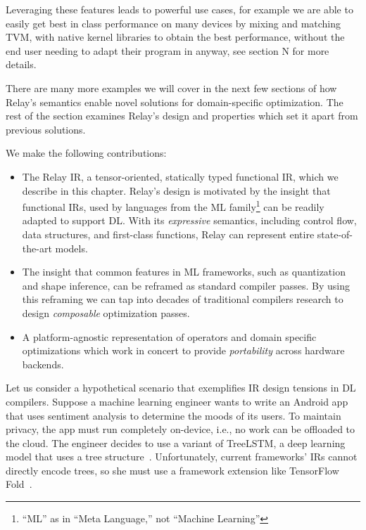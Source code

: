 Leveraging these features leads to powerful use cases, for example we are able to easily get best in class performance on many devices
by mixing and matching TVM, with native kernel libraries to obtain the best performance, without the end user needing to adapt their program
in anyway, see section N for more details.

There are many more examples we will cover in the next few sections of how Relay’s semantics enable novel solutions for domain-specific optimization.
The rest of the section examines Relay’s design and properties which set it apart from previous solutions.

We make the following contributions:
\begin{itemize}
  \item The Relay IR, a tensor-oriented, statically typed
    functional IR,
    which we describe in this chapter.
  Relay's design is motivated by the insight that functional IRs, used by
  languages from the ML family\footnote{``ML'' as in ``Meta Language,'' not
  ``Machine Learning''} can be readily adapted to support DL.
  With its \textit{expressive} semantics,
    including control flow, data structures, and first-class functions,
    Relay can represent entire state-of-the-art models.
  \item The insight that common features in ML frameworks,
    such as quantization and shape inference,
    can be reframed as standard compiler passes.
  By using this reframing we can tap into
    decades of traditional compilers research to design
    \textit{composable} optimization passes.
  \item
    A platform-agnostic representation of operators and domain specific
      optimizations which work in concert to provide \textit{portability}
      across hardware backends.
\end{itemize}


  Let us consider a hypothetical scenario that exemplifies
    IR design tensions in DL compilers.
  Suppose a machine learning engineer wants to write
    an Android app that uses sentiment analysis to
    determine the moods of its users.
  To maintain privacy, the app must run completely on-device,
    i.e., no work can be offloaded to the cloud.
  The engineer decides to use a variant of TreeLSTM,
    a deep learning model that uses a tree structure~\citep{tree_lstm}.
  Unfortunately, current frameworks' IRs cannot directly encode trees,
    so she must use a framework extension
    like TensorFlow Fold~\citep{tensorflowfold}.

